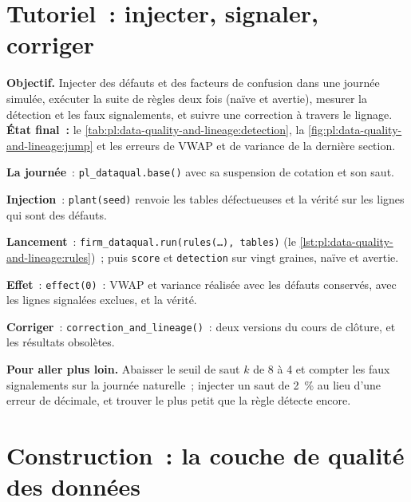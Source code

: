 \section{Tutoriel~: injecter, signaler, corriger}\label{tut:pl:data-quality-and-lineage:tut}

\begin{tutorial}
\textbf{Objectif.} Injecter des défauts et des facteurs de confusion dans une journée simulée, exécuter la suite de règles deux fois (naïve et avertie), mesurer la détection et
les faux signalements, et suivre une correction à travers le lignage. \textbf{État final~:}
le \cref{tab:pl:data-quality-and-lineage:detection}, la \cref{fig:pl:data-quality-and-lineage:jump} et les erreurs de VWAP et de variance de la
dernière section.
\begin{tutsteps}
\item \textbf{La journée}~: \texttt{pl\_dataqual.base()} avec sa suspension de cotation et son saut.
\item \textbf{Injection}~: \texttt{plant(seed)} renvoie les tables défectueuses et la vérité sur les lignes qui sont des défauts.
\item \textbf{Lancement}~: \texttt{firm\_dataqual.run(rules(\dots), tables)} (le \cref{lst:pl:data-quality-and-lineage:rules})~; puis
\texttt{score} et \texttt{detection} sur vingt graines, naïve et avertie.
\item \textbf{Effet}~: \texttt{effect(0)}~: VWAP et variance réalisée avec les défauts conservés, avec les lignes signalées exclues, et la vérité.
\item \textbf{Corriger}~: \texttt{correction\_and\_lineage()}~: deux versions du cours de clôture, et les résultats obsolètes.
\end{tutsteps}
\textbf{Pour aller plus loin.} Abaisser le seuil de saut $k$ de 8 à 4 et compter les faux signalements sur la journée naturelle~; injecter un
saut de 2~\% au lieu d'une erreur de décimale, et trouver le plus petit que la règle détecte encore.
\end{tutorial}

\section{Construction~: la couche de qualité des données}\label{bld:pl:data-quality-and-lineage:dataqual}

